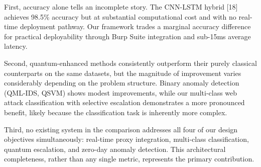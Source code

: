 \documentclass[journal,onecolumn]{IEEEtran}
\begin{document}
First, accuracy alone tells an incomplete story. The CNN-LSTM hybrid [18] achieves 98.5\% accuracy but at substantial computational cost and with no real-time deployment pathway. Our framework trades a marginal accuracy difference for practical deployability through Burp Suite integration and sub-15ms average latency.

Second, quantum-enhanced methods consistently outperform their purely classical counterparts on the same datasets, but the magnitude of improvement varies considerably depending on the problem structure. Binary anomaly detection (QML-IDS, QSVM) shows modest improvements, while our multi-class web attack classification with selective escalation demonstrates a more pronounced benefit, likely because the classification task is inherently more complex.

Third, no existing system in the comparison addresses all four of our design objectives simultaneously: real-time proxy integration, multi-class classification, quantum escalation, and zero-day anomaly detection. This architectural completeness, rather than any single metric, represents the primary contribution.
\end{document}
